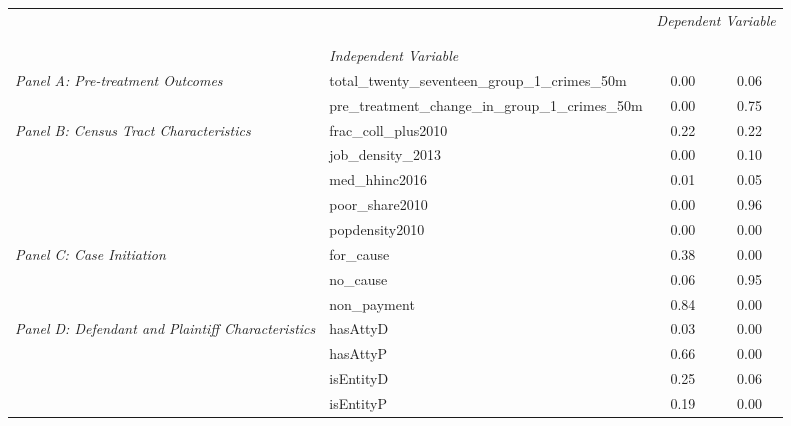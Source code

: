 \begin{tabular}{llcc}
\toprule
 &  & \multicolumn{2}{c}{\textit{Dependent Variable}} \\
\cline{3-4}
\\
 &  &  &  \\
 & \emph{Independent Variable} &  &  \\
\midrule
\multirow[c]{2}{3cm}{\textit{Panel A: Pre-treatment Outcomes}} & total_twenty_seventeen_group_1_crimes_50m & 0.00 & 0.06 \\
 & pre_treatment_change_in_group_1_crimes_50m & 0.00 & 0.75 \\
\cline{1-4}
\multirow[c]{5}{3cm}{\textit{Panel B: Census Tract Characteristics}} & frac_coll_plus2010 & 0.22 & 0.22 \\
 & job_density_2013 & 0.00 & 0.10 \\
 & med_hhinc2016 & 0.01 & 0.05 \\
 & poor_share2010 & 0.00 & 0.96 \\
 & popdensity2010 & 0.00 & 0.00 \\
\cline{1-4}
\multirow[c]{3}{3cm}{\textit{Panel C: Case Initiation}} & for_cause & 0.38 & 0.00 \\
 & no_cause & 0.06 & 0.95 \\
 & non_payment & 0.84 & 0.00 \\
\cline{1-4}
\multirow[c]{4}{3cm}{\textit{Panel D: Defendant and Plaintiff Characteristics}} & hasAttyD & 0.03 & 0.00 \\
 & hasAttyP & 0.66 & 0.00 \\
 & isEntityD & 0.25 & 0.06 \\
 & isEntityP & 0.19 & 0.00 \\
\cline{1-4}
\bottomrule
\end{tabular}
